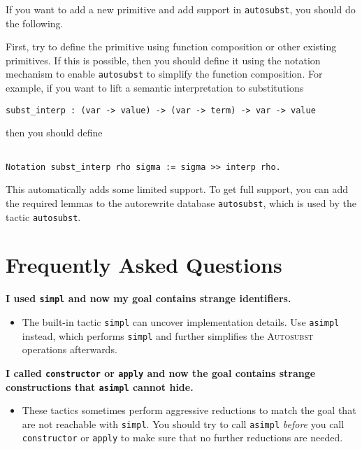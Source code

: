 \documentclass{scrartcl}
\newcommand{\faq}[2]{\vspace{\topsep}\noindent\textbf{#1}\\\vspace{-\topsep}\begin{itemize}[nolistsep]\item[]{#2}\end{itemize}}
\newcommand{\Autosubst}{\textsc{Autosubst}\xspace}
\newcommand{\lst}{\lstinline}
\begin{document}
If you want to add a new primitive and add support in \lst$autosubst$, you should do the following.

First, try to define the primitive using function composition or other existing primitives.
If this is possible, then you should define it using the notation mechanism to enable \lst$autosubst$ to simplify the function composition.
For example, if you want to lift a semantic interpretation to substitutions 
\begin{lstlisting}
subst_interp : (var -> value) -> (var -> term) -> var -> value  
\end{lstlisting}
then you should define
\begin{lstlisting}

Notation subst_interp rho sigma := sigma >> interp rho.
\end{lstlisting}
This automatically adds some limited support. To get full support, you can add the required lemmas to the autorewrite database \lst$autosubst$, which is used by the tactic \lst$autosubst$.


\section{Frequently Asked Questions}
\label{sec:faq}

\faq{I used \lst$simpl$ and now my goal contains strange identifiers.}
{The built-in tactic \lst$simpl$ can uncover implementation details. Use \lst$asimpl$ instead, which performs \lst$simpl$ and further simplifies the \Autosubst operations afterwards.}

\faq{I called \lst$constructor$ or \lst$apply$ and now the goal contains strange constructions that \lst$asimpl$ cannot hide.}
{These tactics sometimes perform aggressive reductions to match the goal that are not reachable with \lst$simpl$. You should try to call \lst$asimpl$ \emph{before} you call \lst$constructor$ or \lst$apply$ to make sure that no further reductions are needed.
}



\end{document}
